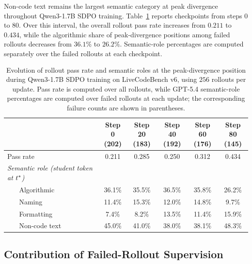 Non-code text remains the largest semantic category at peak divergence throughout Qwen3-1.7B SDPO training. Table~\ref{tab:stepwise} reports checkpoints from steps $0$ to $80$. Over this interval, the overall rollout pass rate increases from $0.211$ to $0.434$, while the algorithmic share of peak-divergence positions among failed rollouts decreases from $36.1\%$ to $26.2\%$. Semantic-role percentages are computed separately over the failed rollouts at each checkpoint.

\begin{table}[ht]
\caption{Evolution of rollout pass rate and semantic roles at the peak-divergence position during Qwen3-1.7B SDPO training on LiveCodeBench v6, using $256$ rollouts per update. Pass rate is computed over all rollouts, while GPT-5.4 semantic-role percentages are computed over failed rollouts at each update; the corresponding failure counts are shown in parentheses.}  \label{tab:stepwise}
  \centering
  \small
  \begin{tabular*}{\linewidth}{@{\extracolsep{\fill}}llccccc@{\hspace{6pt}}}
    \toprule
    & & \makecell{Step 0\\(202)} & \makecell{Step 20\\(183)} & \makecell{Step 40\\(192)} & \makecell{Step 60\\(176)} & \makecell{Step 80\\(145)} \\
    \midrule
    \multicolumn{2}{l}{Pass rate} & 0.211 & 0.285 & 0.250 & 0.312 & 0.434 \\
    \midrule
    \multicolumn{2}{l}{\textit{Semantic role ({student token at $t^{*}$})}} \\
    & Algorithmic   & 36.1\% & 35.5\% & 36.5\% & 35.8\% & 26.2\% \\
    & Naming        & 11.4\% & 15.3\% & 12.0\% & 14.8\% &  9.7\% \\
    & Formatting    &  7.4\% &  8.2\% & 13.5\% & 11.4\% & 15.9\% \\
    & Non-code text & 45.0\% & 41.0\% & 38.0\% & 38.1\% & 48.3\% \\
    \bottomrule
  \end{tabular*}
\end{table}

\subsection{Contribution of Failed-Rollout Supervision}
\label{app:failed-supervision}

